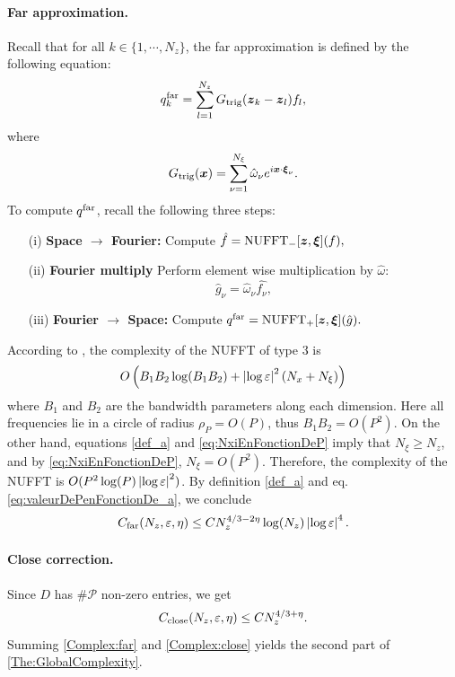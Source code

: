 \documentclass[main]{subfiles}
\begin{document}
\paragraph{Far approximation.} Recall that for all $k \in \{1,\cdots,N_z\}$, the far approximation is defined by the following equation:
\[ q^{\text{far}}_k = \sum_{l=1}^{N_z} G_{\textup{trig}}(\boldsymbol{z}_k - \boldsymbol{z}_l) f_l,\]
where
\[ G_{\textup{trig}}(\boldsymbol{x}) = \sum_{\nu=1}^{N_\xi} \hat{\omega}_\nu e^{i \boldsymbol{x} \cdot \boldsymbol{\xi}_\nu}.\]
To compute $q^{\textup{far}}$, recall the following three steps:
\begin{itemize}
	\setlength{\itemindent}{2em}
	\item[(i)] \textbf{Space $\rightarrow$ Fourier: } Compute $\hat{f} = \textup{NUFFT}_-[\boldsymbol{z},\boldsymbol{\xi}](f),$
	\item[(ii)] \textbf{Fourier multiply} Perform element wise multiplication by $\hat{\omega}$: 
	\[\hat{g}_{\nu} = \hat{\omega}_\nu \hat{f_\nu},\]
	\item[(iii)] \textbf{Fourier $\rightarrow$ Space: } Compute $q^{\text{far}} =  \textup{NUFFT}_+[\boldsymbol{z},\boldsymbol{\xi}](\hat{g}).$
	\setlength{\itemindent}{0em}
\end{itemize}
According to \cite[Sec.	 4.3]{keiner2009using}, the complexity of the NUFFT of type 3 is 
\[O\left(B_1 B_2 \log (B_1 B_2) + \left\lvert \log\varepsilon \right\rvert^2(N_x + N_\xi)\right)\]
where $B_1$ and $B_2$ are the bandwidth parameters along each dimension. Here all frequencies lie in a circle of radius $\rho_P = O(P)$, thus $B_1B_2 = O(P^2)$. On the other hand, equations \eqref{def_a} and  \eqref{eq:NxiEnFonctionDeP} imply that $N_{\xi} \geq N_z$, and by \eqref{eq:NxiEnFonctionDeP}, $N_\xi = O(P^2)$. Therefore, the complexity of the NUFFT is $O(P^2 \log(P) \left\lvert \log \varepsilon \right\rvert^2)$. By definition \eqref{def_a} and eq. \eqref{eq:valeurDePenFonctionDe_a}, we conclude
\begin{equation}
\label{Complex:far}
C_{\textup{far}}(N_z,\varepsilon,\eta) \leq C N_z^{4/3 - 2\eta}\log(N_z) \left\lvert \log \varepsilon \right\rvert^{4} .
\end{equation}
\paragraph{Close correction.} Since $D$ has $\# \mathcal{P}$ non-zero entries, we get 
\begin{equation}
\label{Complex:close}
C_{\textup{close}}(N_z,\varepsilon,\eta) \leq C N_z^{4/3 + \eta}.
\end{equation}
Summing \eqref{Complex:far} and \eqref{Complex:close} yields the second part of \autoref{The:GlobalComplexity}. 
\end{document}
